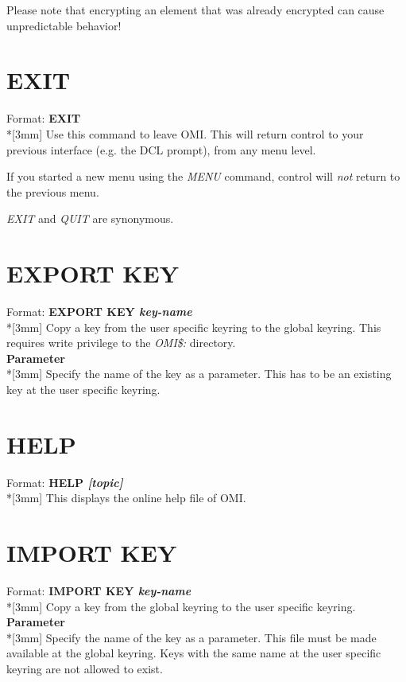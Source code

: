 \documentclass[a4paper]{book}
\newcommand{\vs}{\vspace{3mm}}
\renewcommand{\indent}{\hspace*{5mm}}
\begin{document}
\vs

Please note that encrypting an element that was already encrypted can cause 
unpredictable behavior!

\section{EXIT}
\label{subsec:mylabel14}

\indent Format: \textbf{EXIT}\dag\\*[3mm]
Use this command to leave OMI. This will return control to your previous 
interface (e.g. the DCL prompt), from any menu level.

If you started a new menu using the \textsl{MENU} command, control will \textit{not} return to 
the previous menu.

\vs

\textsl{EXIT} and \textsl{QUIT} are 
synonymous.

\section{EXPORT KEY}
\label{subsec:export}

\indent Format: \textbf{EXPORT KEY \textit{key-name}}\\*[3mm]
Copy a key from the user specific keyring to the global keyring. This 
requires write privilege to the \textsl{OMI{\$}:} directory.\\[3mm]
\textbf{Parameter}\\*[3mm]
Specify the name of the key as a parameter. This has to be an existing key 
at the user specific keyring.

\section{HELP}
\label{subsec:mylabel15}

\indent Format: \textbf{HELP \textit{[topic]}}\\*[3mm]
This displays the online help file of OMI.

\section{IMPORT KEY}
\label{subsec:import}

\indent Format: \textbf{IMPORT KEY \textit{key-name}}\\*[3mm]
Copy a key from the global keyring to the user specific keyring.\\[3mm]
\textbf{Parameter}\\*[3mm]
Specify the name of the key as a parameter. This file must be made available 
at the global keyring. Keys with the same name at the user specific keyring 
are not allowed to exist.
\end{document}
